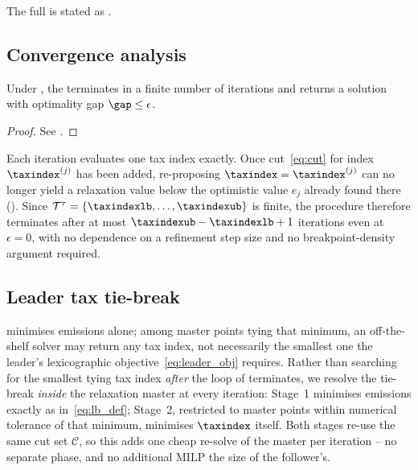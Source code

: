 The full \DBP is stated as .



\subsection{Convergence analysis}
\label{sec:method:convergence}

\begin{theorem}\label{thm:convergence}
Under , the \DBP terminates in a
finite number of iterations and returns a solution with optimality
gap $\gap\le\epsilon$.
\end{theorem}

\begin{proof}
See .
\end{proof}

\begin{remark}\label{rem:iter}
Each iteration evaluates one tax index exactly. Once cut~\eqref{eq:cut}
for index $\taxindex^{(j)}$ has been added, re-proposing
$\taxindex=\taxindex^{(j)}$ can no longer yield a relaxation value below
the optimistic value $e_{j}$ already found there ().
Since $\mathcal{T}^{\tau}=\{\taxindexlb,\ldots,\taxindexub\}$ is finite, the
procedure therefore terminates after at most $\taxindexub-\taxindexlb+1$
iterations even at $\epsilon=0$, with no dependence on a refinement
step size and no breakpoint-density argument required.
\end{remark}

\subsection{Leader tax tie-break}
\label{sec:method:tiebreak}

 minimises emissions alone; among master points tying
that minimum, an off-the-shelf \MILP solver may return any tax index,
not necessarily the smallest one the leader's lexicographic
objective~\eqref{eq:leader_obj} requires. Rather than searching for the
smallest tying tax index \emph{after} the \DBP loop of 
terminates, we resolve the tie-break \emph{inside} the relaxation
master at every iteration: Stage~1 minimises emissions exactly as
in~\eqref{eq:lb_def}; Stage~2, restricted to master points within
numerical tolerance of that minimum, minimises $\taxindex$ itself. Both
stages re-use the same cut set $\mathcal{C}$, so this adds one cheap
re-solve of the master per iteration -- no separate phase, and no
additional MILP the size of the follower's.

